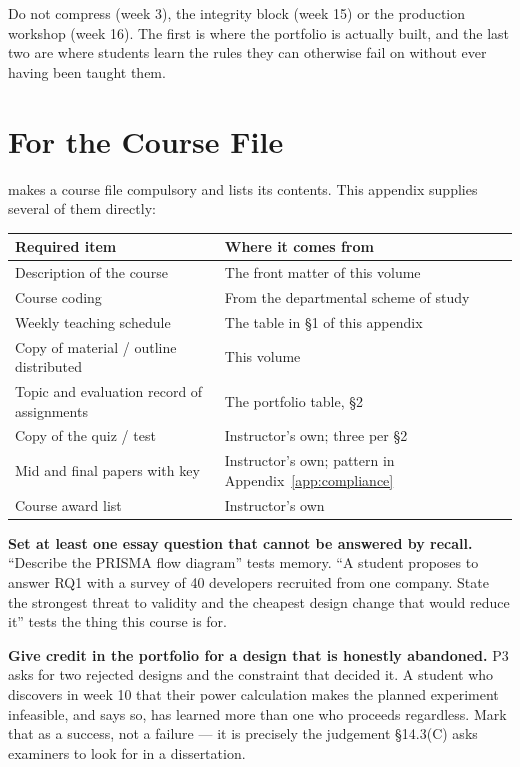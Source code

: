 \noindent
Do not compress  (week 3), the integrity block (week 15) or the
production workshop (week 16). The first is where the portfolio is actually
built, and the last two are where students learn the rules they can otherwise
fail on without ever having been taught them.

\section{For the Course File}

 makes a course file compulsory and lists its
contents. This appendix supplies several of them directly:

\begin{center}
\small
\begin{tabular}{@{}L{7.0cm}L{7.3cm}@{}}
\toprule
\textbf{Required item} & \textbf{Where it comes from} \\
\midrule
Description of the course        & The front matter of this volume \\
Course coding                    & From the departmental scheme of study \\
Weekly teaching schedule         & The table in \S1 of this appendix \\
Copy of material / outline distributed & This volume \\
Topic and evaluation record of assignments & The portfolio table, \S2 \\
Copy of the quiz / test          & Instructor's own; three per \S2 \\
Mid and final papers with key    & Instructor's own; pattern in
                                   Appendix~\ref{app:compliance} \\
Course award list                & Instructor's own \\
\bottomrule
\end{tabular}
\end{center}

\begin{conceptbox}
\textbf{Set at least one essay question that cannot be answered by
recall.} ``Describe the PRISMA flow diagram'' tests memory. ``A student
proposes to answer RQ1 with a survey of 40 developers recruited from one
company. State the strongest threat to validity and the cheapest design change
that would reduce it'' tests the thing this course is for.

\medskip
\textbf{Give credit in the portfolio for a design that is honestly abandoned.}
P3 asks for two rejected designs and the constraint that decided it. A student
who discovers in week 10 that their power calculation makes the planned
experiment infeasible, and says so, has learned more than one who proceeds
regardless. Mark that as a success, not a failure --- it is precisely the
judgement \S14.3(C) asks examiners to look for in a dissertation.
\end{conceptbox}
